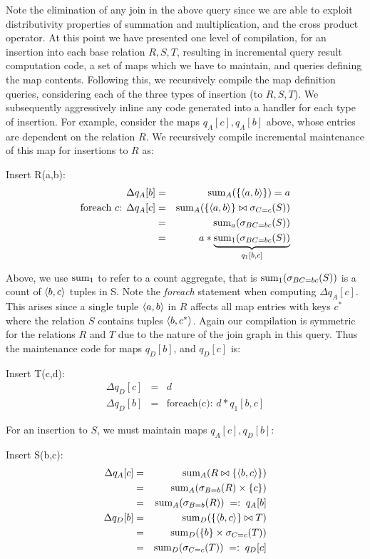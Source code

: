 Note the elimination of any join in the above query since we are able to exploit
distributivity properties of summation and multiplication, and the cross product
operator. At this point we have presented one level of compilation, for an
insertion into each base relation $R, S, T$, resulting in incremental query
result computation code, a set of maps which we have to maintain, and queries
defining the map contents. Following this, we recursively compile the map
definition queries, considering each of the three types of insertion (to
$R,S,T$). We subsequently aggressively inline any code generated into a handler
for each type of insertion. For example, consider the maps $q_A[c], q_A[b]$
above, whose entries are dependent on the relation $R$. We recursively compile
incremental maintenance of this map for insertions to $R$ as:

\smallskip
Insert R(a,b):
\begin{eqnarray*}
\Delta q_A[b] &=& \mathrm{sum}_{A}(\{{\langle a,b\rangle}\}) = a
\\
\mbox{foreach $c$: }
\Delta q_A[c] &=& \mathrm{sum}_{A}(\{{\langle a,b\rangle}\} \bowtie \sigma_{C=c}(S))
\\ &=&
\mathrm{sum}_{a}(\sigma_{BC=bc}(S))
\\ &=&
a * \underbrace{\mathrm{sum}_{1}(\sigma_{BC=bc}(S))}_{q_1[b,c]}
\end{eqnarray*}

Above, we use $\mathrm{sum}_{1}$ to refer to a count aggregate, that is 
$\mathrm{sum}_{1}(\sigma_{BC=bc}(S))$ is a count of ${\langle b,c\rangle}$ tuples in S.
Note the \textit{foreach} statement when computing $\Delta q_A[c]$. This arises
since a single tuple ${\langle a,b\rangle}$ in $R$ affects all map entries with keys
$c^*$ where the relation $S$ contains tuples ${\langle b,c^*\rangle}$. Again our
compilation is symmetric for the relations $R$ and $T$ due to the nature of the
join graph in this query. Thus the maintenance code for maps $q_D[b]$, and 
$q_D[c]$ is:

\smallskip
Insert T(c,d):
\begin{eqnarray*}
\Delta q_D[c] &=& d\\
\Delta q_D[b] &=& \mbox{foreach(c): } d * q_1[b,c]
\end{eqnarray*}

\noindent For an insertion to $S$, we must maintain maps $q_A[c], q_D[b]$:

\smallskip
Insert S(b,c):
\begin{eqnarray*}
\Delta q_A[c] &=&
\mathrm{sum}_{A}(R \bowtie \{{\langle b,c\rangle}\})
\\ &=&
\mathrm{sum}_{A}(\sigma_{B=b}(R) \times \{c\})
\\ &=&
\mathrm{sum}_{A}(\sigma_{B=b}(R))
\;=:\; q_A[b]
\\
\Delta q_D[b] &=&
\mathrm{sum}_{D}(\{{\langle b,c\rangle}\} \bowtie T)
\\ &=&
\mathrm{sum}_{D}(\{b\} \times \sigma_{C=c}(T))
\\ &=&
\mathrm{sum}_{D}(\sigma_{C=c}(T))
\;=:\; q_D[c]
\end{eqnarray*}

